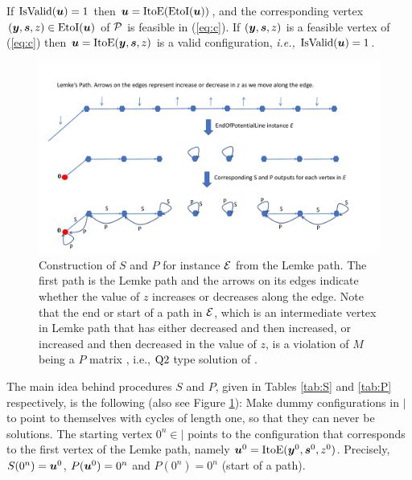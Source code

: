 \begin{lemma}\label{lem:vert}
If $\mbox{IsValid}(\mbox{\boldmath $u$})=1$ then $\mbox{\boldmath $u$}=\mbox{ItoE}(\mbox{EtoI}(\mbox{\boldmath $u$}))$, and the corresponding vertex $(\mbox{\boldmath $y$},\mbox{\boldmath $s$},z)\in \mbox{EtoI}(\mbox{\boldmath $u$})$ of $\mbox{${\mathcal P}$}$ is feasible in (\ref{eq:c}). If $(\mbox{\boldmath $y$},\mbox{\boldmath $s$},z)$ is a feasible vertex of (\ref{eq:c}) then $\mbox{\boldmath $u$}=\mbox{ItoE}(\mbox{\boldmath $y$},\mbox{\boldmath $s$},z)$ is a valid configuration, {\em i.e.,} $\mbox{IsValid}(\mbox{\boldmath $u$})=1$.
\end{lemma}

\begin{figure}[htbp]
   \centering
\vspace{-1cm}

  \includegraphics[width=\textwidth]{plcp-fig.pdf}
 \caption{Construction of $S$ and $P$ for \EOPL instance $\mbox{${\mathcal E}$}$ from the Lemke
 	path. The first path is the Lemke path and the arrows on its edges indicate
 	whether the value of $z$ increases or decreases along the edge.  Note that
 	the end or start of a path in $\mbox{${\mathcal E}$}$, which is an intermediate vertex in
 	Lemke path that has either decreased and then increased, or increased and then
 	decreased in the value of $z$, is a violation of $M$ being a $P$ matrix
 	\cite{cottle2009linear}, i.e., $\mbox{Q2}$ type solution of
 	\PLCP.}
 	\label{fig:path}
\end{figure}   


The main idea behind procedures $S$ and $P$, given in Tables \ref{tab:S} and
\ref{tab:P} respectively, is the following (also see Figure \ref{fig:path}):
Make dummy configurations in $\vert$ to point to themselves with cycles of
length one, so that they can never be solutions. 
The starting vertex $0^n \in \vert$ points to the configuration that corresponds
to the first vertex of the Lemke path, namely $\mbox{\boldmath $u$}^0=\mbox{ItoE}(\mbox{\boldmath $y$}^0,\mbox{\boldmath $s$}^0,z^0)$. 
Precisely, $S(0^n)=\mbox{\boldmath $u$}^0$, $P(\mbox{\boldmath $u$}^0)=0^n$ and $P(0^n)=0^n$ (start of
a path). 


